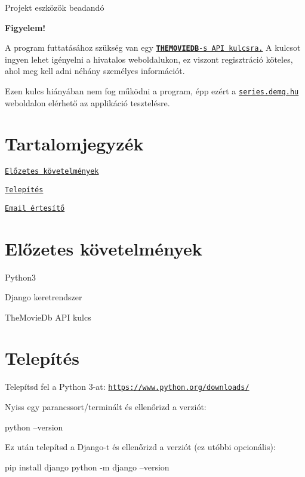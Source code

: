Projekt eszközök beadandó

{\bfseries Figyelem!}

A program futtatásához szükség van egy \href{https://www.themoviedb.org/faq/api}{\tt {\bfseries T\+H\+E\+M\+O\+V\+I\+E\+DB}-\/s A\+PI kulcsra.} A kulcsot ingyen lehet igényelni a hivatalos weboldalukon, ez viszont regisztráció köteles, ahol meg kell adni néhány személyes információt.

Ezen kulcs hiányában nem fog működni a program, épp ezért a \href{https://series.demq.hu}{\tt series.\+demq.\+hu} weboldalon elérhető az applikáció tesztelésre.

\section*{Tartalomjegyzék }


\begin{DoxyItemize}
\item \href{#előzetes-követelmények}{\tt Előzetes követelmények}
\item \href{#telepítés}{\tt Telepítés}
\item \href{#email-értesítő}{\tt Email értesítő}
\end{DoxyItemize}

\section*{Előzetes követelmények }


\begin{DoxyItemize}
\item Python3
\item Django keretrendszer
\item The\+Movie\+Db A\+PI kulcs
\end{DoxyItemize}

\section*{Telepítés }

Telepítsd fel a Python 3-\/at\+: \href{https://www.python.org/downloads/}{\tt https\+://www.\+python.\+org/downloads/}

Nyiss egy parancssort/terminált és ellenőrizd a verziót\+: 
\begin{DoxyCode}
python --version
\end{DoxyCode}
 Ez után telepítsd a Django-\/t és ellenőrizd a verziót (ez utóbbi opcionális)\+: 
\begin{DoxyCode}
pip install django
python -m django --version
\end{DoxyCode}


